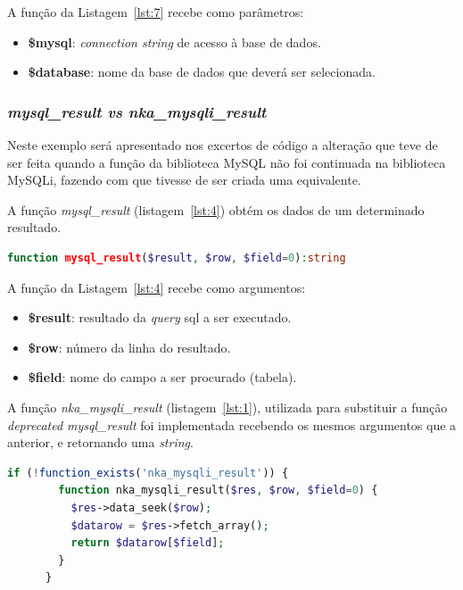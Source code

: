 A função da Listagem~\ref{lst:7} recebe como parâmetros:
\begin{itemize}
  \item \textbf{\$mysql}: \textit{connection string} de acesso à base de dados.
  \item \textbf{\$database}: nome da base de dados que deverá ser selecionada.
\end{itemize}


\subsubsection{\textit{mysql\_result vs nka\_mysqli\_result}}

Neste exemplo será apresentado nos excertos de código a alteração que teve de ser feita quando a função da biblioteca MySQL não foi continuada na biblioteca MySQLi, fazendo com que tivesse de ser criada uma equivalente.

A função \textit{mysql\_result} (listagem~\ref{lst:4}) obtém os dados de um determinado resultado.

\begin{lstlisting}[language={php},
                   caption={Função mysql\_result.},
                   label=lst:4]
    	function mysql_result($result, $row, $field=0):string

\end{lstlisting}

A função da Listagem~\ref{lst:4} recebe como argumentos:
\begin{itemize}
  \item \textbf{\$result}: resultado da \textit{query} \acrshort{sql} a ser executado.
  \item \textbf{\$row}: número da linha do resultado.
  \item \textbf{\$field}: nome do campo a ser procurado (tabela).
\end{itemize}


A função \textit{nka\_mysqli\_result} (listagem~\ref{lst:1}), utilizada para substituir a função \textit{deprecated mysql\_result} foi implementada recebendo os mesmos argumentos que a anterior, e retornando uma \textit{string}.

\begin{lstlisting}[language={php},
                   caption={Função para substituir mysql\_result.},
                   label=lst:1]
      if (!function_exists('nka_mysqli_result')) {
      	function nka_mysqli_result($res, $row, $field=0) {
      	  $res->data_seek($row);
      	  $datarow = $res->fetch_array();
      	  return $datarow[$field];
      	}
      }
\end{lstlisting}

